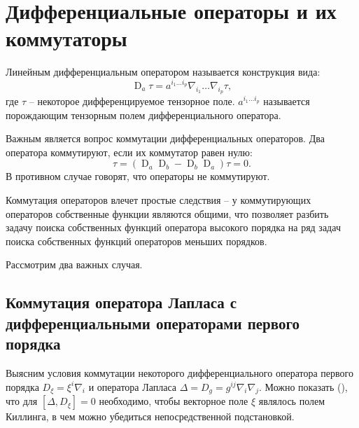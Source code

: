 \documentclass[12pt,a4paper]{article}
\DeclareMathOperator{\D}{D}
\begin{document}

    \section{Дифференциальные операторы и их коммутаторы\label{sec:commutators}}

        Линейным дифференциальным оператором называется конструкция вида:
        \begin{equation}
            \D_a\tau = a^{i_1 \dots i_p} \nabla_{i_1} \dots \nabla_{i_p} \tau ,
        \end{equation}
        где $\tau$ -- некоторое дифференцируемое тензорное поле. $a^{i_1 \dots i_p}$ называется порождающим тензорным полем дифференциального оператора.

        Важным является вопрос коммутации дифференциальных операторов. Два оператора коммутируют, если их коммутатор равен нулю:
        \begin{equation}
            [\D_a, \D_b]\tau = (\D_a \D_b - \D_b \D_a) \tau = 0 .
        \end{equation}
        В противном случае говорят, что операторы не коммутируют.

        Коммутация операторов влечет простые следствия -- у коммутирующих операторов собственные функции являются общими, что позволяет разбить задачу поиска собственных функций оператора высокого порядка на ряд задач поиска собственных функций операторов меньших порядков.

        Рассмотрим два важных случая.

        \subsection{Коммутация оператора Лапласа с дифференциальными операторами первого порядка}

            Выясним условия коммутации некоторого дифференциального оператора первого порядка $D_\xi = \xi^i \nabla_i$ и оператора Лапласа $\Delta = D_g = g^{ij} \nabla_i \nabla_j$. Можно показать (\cite{differential_operator_commutators}), что для $[\Delta, D_\xi] = 0$ необходимо, чтобы векторное поле $\xi$ являлось полем Киллинга, в чем можно убедиться непосредственной подстановкой.
\end{document}
